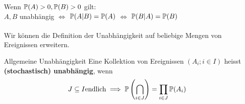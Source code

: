 Wenn $\P(A) > 0, \P(B) > 0$ gilt:\\
 $A,B$ unabhängig $\iff$ $\P(A|B)=\P(A)$ $\iff$ $\P(B|A)=\P(B)$
\\
\\
Wir können die Definition der Unabhängigkeit auf beliebige Mengen von Ereignissen erweitern.
\begin{mainbox}{Allgemeine Unabhängigkeit}
    Eine Kollektion von Ereignissen $(A_i; i \in I)$ heisst \textbf{(stochastisch) unabhängig}, wenn 
    $$J \subseteq I \text{endlich} \implies \P\left(\bigcap_{i\in J}\right) = \prod_{i \in J} \P(A_i)$$
\end{mainbox}